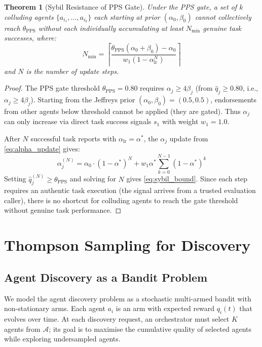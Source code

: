 \documentclass[conference]{IEEEtran}
\newtheorem{theorem}{Theorem}
\begin{document}
\begin{theorem}[Sybil Resistance of PPS Gate]
\label{thm:sybil}
Under the PPS gate, a set of $k$ colluding agents
$\{a_{i_1}, \ldots, a_{i_k}\}$ each starting at prior
$(\alpha_0, \beta_0)$ cannot collectively reach
$\theta_{\text{PPS}}$ without each individually accumulating
at least $N_{\min}$ genuine task successes, where:
\begin{equation}
  N_{\min} = \left\lceil \frac{\theta_{\text{PPS}}(\alpha_0
    + \beta_0) - \alpha_0}{w_1 (1 - \alpha_{\text{lr}}^{N})}
  \right\rceil
  \label{eq:sybil_bound}
\end{equation}
and $N$ is the number of update steps.
\end{theorem}
\begin{proof}
The PPS gate threshold $\theta_{\text{PPS}} = 0.80$ requires
$\alpha_j \geq 4\beta_j$ (from $\hat{q}_j \geq 0.80$,
i.e., $\alpha_j \geq 4\beta_j$). Starting from the Jeffreys
prior $(\alpha_0, \beta_0) = (0.5, 0.5)$, endorsements from
other agents below threshold cannot be applied (they are
gated). Thus $\alpha_j$ can only increase via direct task
success signals $s_1$ with weight $w_1 = 1.0$.

After $N$ successful task reports with $\alpha_{\text{lr}} =
\alpha^*$, the $\alpha_j$ update from \eqref{eq:alpha_update}
gives:
\begin{equation}
  \alpha_j^{(N)} = \alpha_0 \cdot (1-\alpha^*)^N +
    w_1 \alpha^* \sum_{k=0}^{N-1}(1-\alpha^*)^k
\end{equation}
Setting $\hat{q}_j^{(N)} \geq \theta_{\text{PPS}}$ and
solving for $N$ gives \eqref{eq:sybil_bound}. Since each
step requires an authentic task execution (the signal arrives
from a trusted evaluation caller), there is no shortcut for
colluding agents to reach the gate threshold without genuine
task performance.
\end{proof}

\section{Thompson Sampling for Discovery}
\label{sec:thompson}

\subsection{Agent Discovery as a Bandit Problem}

We model the agent discovery problem as a stochastic
multi-armed bandit with non-stationary arms. Each agent
$a_i$ is an arm with expected reward $q_i(t)$ that evolves
over time. At each discovery request, an orchestrator must
select $K$ agents from $\mathcal{A}$; its goal is to
maximise the cumulative quality of selected agents while
exploring undersampled agents.
\end{document}
